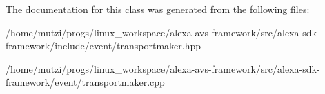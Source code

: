 The documentation for this class was generated from the following files\+:\begin{DoxyCompactItemize}
\item 
/home/mutzi/progs/linux\+\_\+workspace/alexa-\/avs-\/framework/src/alexa-\/sdk-\/framework/include/event/transportmaker.\+hpp\item 
/home/mutzi/progs/linux\+\_\+workspace/alexa-\/avs-\/framework/src/alexa-\/sdk-\/framework/event/transportmaker.\+cpp\end{DoxyCompactItemize}
